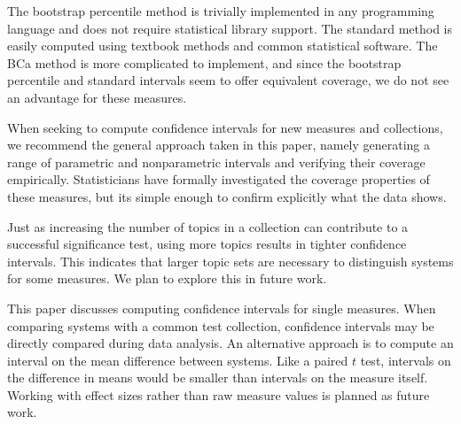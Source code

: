 \documentclass{sig-alt-release-2013}
\begin{document}
The bootstrap percentile method is trivially implemented in any programming language and does not require statistical library support.  The standard method is easily computed using textbook methods and common statistical software.  The BCa method is more complicated to implement, and since the bootstrap percentile and standard intervals seem to offer equivalent coverage, we do not see an advantage for these measures.

When seeking to compute confidence intervals for new measures and collections, we recommend the general approach taken in this paper, namely generating a range of parametric and nonparametric intervals and verifying their coverage empirically. Statisticians have formally investigated the coverage properties of these measures, but its simple enough to confirm explicitly what the data shows.

Just as increasing the number of topics in a collection can contribute to a successful significance test, using more topics results in tighter confidence intervals.  This indicates that larger topic sets are necessary to distinguish systems for some measures.  We plan to explore this in future work.

This paper discusses computing confidence intervals for single measures.  When comparing systems with a common test collection, confidence intervals may be directly compared during data analysis.  An alternative approach is to compute an interval on the mean difference between systems.  Like a paired $t$ test, intervals on the difference in means would be smaller than intervals on the measure itself.  Working with effect sizes rather than raw measure values is planned as future work.

{}

\end{document}
